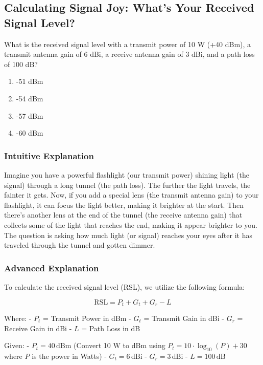 \subsection{Calculating Signal Joy: What's Your Received Signal Level?}

\begin{tcolorbox}[colback=blue!5, colframe=blue!80, title={Question ID: E4D13}]
    What is the received signal level with a transmit power of 10 W (+40 dBm), a transmit antenna gain of 6 dBi, a receive antenna gain of 3 dBi, and a path loss of 100 dB?
    \begin{enumerate}[label=\Alph*.]
        \item -51 dBm
        \item -54 dBm
        \item -57 dBm
        \item -60 dBm
    \end{enumerate}
\end{tcolorbox}

\subsubsection{Intuitive Explanation}
Imagine you have a powerful flashlight (our transmit power) shining light (the signal) through a long tunnel (the path loss). The further the light travels, the fainter it gets. Now, if you add a special lens (the transmit antenna gain) to your flashlight, it can focus the light better, making it brighter at the start. Then there's another lens at the end of the tunnel (the receive antenna gain) that collects some of the light that reaches the end, making it appear brighter to you. The question is asking how much light (or signal) reaches your eyes after it has traveled through the tunnel and gotten dimmer.

\subsubsection{Advanced Explanation}
To calculate the received signal level (RSL), we utilize the following formula:

\[
\text{RSL} = P_t + G_t + G_r - L
\]

Where:
- \( P_t \) = Transmit Power in dBm
- \( G_t \) = Transmit Gain in dBi
- \( G_r \) = Receive Gain in dBi
- \( L \) = Path Loss in dB

Given:
- \( P_t = 40 \, \text{dBm} \) (Convert 10 W to dBm using \( P_t = 10 \cdot \log_{10}(P) + 30 \) where \( P \) is the power in Watts)
- \( G_t = 6 \, \text{dBi} \)
- \( G_r = 3 \, \text{dBi} \)
- \( L = 100 \, \text{dB} \)

